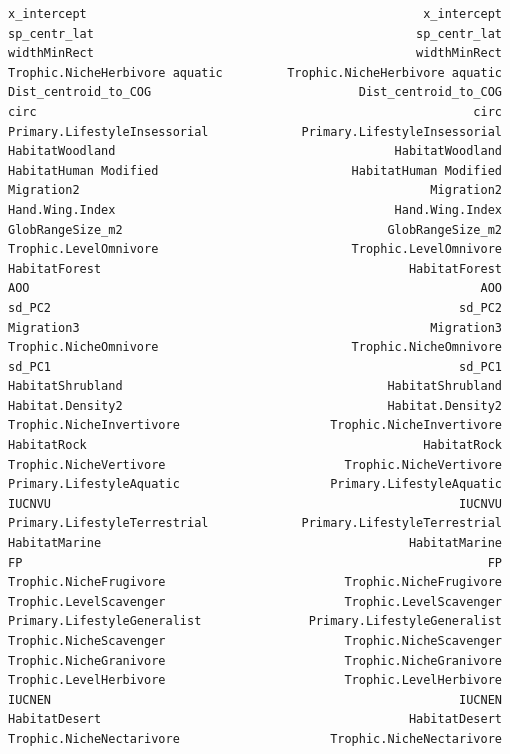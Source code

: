 \documentclass[
  letterpaper,
  DIV=11,
  numbers=noendperiod]{scrreprt}
\begin{document}
\begin{verbatim}
x_intercept                                               x_intercept
sp_centr_lat                                             sp_centr_lat
widthMinRect                                             widthMinRect
Trophic.NicheHerbivore aquatic         Trophic.NicheHerbivore aquatic
Dist_centroid_to_COG                             Dist_centroid_to_COG
circ                                                             circ
Primary.LifestyleInsessorial             Primary.LifestyleInsessorial
HabitatWoodland                                       HabitatWoodland
HabitatHuman Modified                           HabitatHuman Modified
Migration2                                                 Migration2
Hand.Wing.Index                                       Hand.Wing.Index
GlobRangeSize_m2                                     GlobRangeSize_m2
Trophic.LevelOmnivore                           Trophic.LevelOmnivore
HabitatForest                                           HabitatForest
AOO                                                               AOO
sd_PC2                                                         sd_PC2
Migration3                                                 Migration3
Trophic.NicheOmnivore                           Trophic.NicheOmnivore
sd_PC1                                                         sd_PC1
HabitatShrubland                                     HabitatShrubland
Habitat.Density2                                     Habitat.Density2
Trophic.NicheInvertivore                     Trophic.NicheInvertivore
HabitatRock                                               HabitatRock
Trophic.NicheVertivore                         Trophic.NicheVertivore
Primary.LifestyleAquatic                     Primary.LifestyleAquatic
IUCNVU                                                         IUCNVU
Primary.LifestyleTerrestrial             Primary.LifestyleTerrestrial
HabitatMarine                                           HabitatMarine
FP                                                                 FP
Trophic.NicheFrugivore                         Trophic.NicheFrugivore
Trophic.LevelScavenger                         Trophic.LevelScavenger
Primary.LifestyleGeneralist               Primary.LifestyleGeneralist
Trophic.NicheScavenger                         Trophic.NicheScavenger
Trophic.NicheGranivore                         Trophic.NicheGranivore
Trophic.LevelHerbivore                         Trophic.LevelHerbivore
IUCNEN                                                         IUCNEN
HabitatDesert                                           HabitatDesert
Trophic.NicheNectarivore                     Trophic.NicheNectarivore

\end{verbatim}
\end{document}
